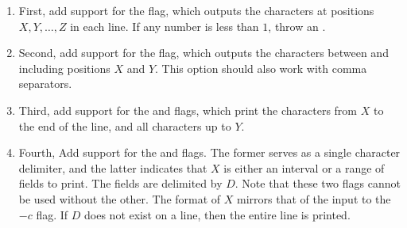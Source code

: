 
\begin{enumerate}[label=(\alph*)]
    \item First, add support for the  flag, which outputs the characters at positions $X,Y,\ldots,Z$ in each line. If any number is less than $1$, throw an .
    \item Second, add support for the  flag, which outputs the characters between and including positions $X$ and $Y$. This option should also work with comma separators.
    \item Third, add support for the  and  flags, which print the characters from $X$ to the end of the line, and all characters up to $Y$.
    \item Fourth, Add support for the  and  flags. The former serves as a single character delimiter, and the latter indicates that $X$ is either an interval or a range of fields to print. The fields are delimited by $D$. Note that these two flags cannot be used without the other. The format of $X$ mirrors that of the input to the $-c$ flag. If $D$ does not exist on a line, then the entire line is printed.
\end{enumerate}


